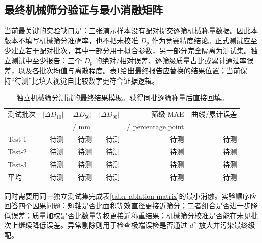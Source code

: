 \subsection{最终机械筛分验证与最小消融矩阵}

当前最关键的实验缺口是：三张演示样本没有配对提交逐筛机械称量数据。因此本版本不填写机械筛分准确率，也不把未校准 $D_p$ 作为竞赛精度结论。正式测试应至少建立若干配对批次，其中一部分用于拟合参数，另一部分完全隔离为测试集。独立测试中至少报告：三个 $D_p$ 的绝对/相对误差、逐筛级质量占比或累计通过率误差，以及各批次均值与离散程度。表\ref{tab:r-physical-template}给出最终报告应替换的结果位置；当前保持“待测”比填入视觉自比较数字更符合证据逻辑。

\begin{table}[t]
\centering
\caption{独立机械筛分测试的最终结果模板。获得同批逐筛称量后直接回填。}
\label{tab:r-physical-template}
\footnotesize
\renewcommand{\arraystretch}{1.12}
\begin{tabular}{lrrrrr}
\toprule
测试批次 & $|\Delta D_{10}|$ & $|\Delta D_{50}|$ & $|\Delta D_{90}|$ & 筛级 MAE & 曲线/累计误差 \\
 & \multicolumn{3}{c}{/ mm} & / percentage point & \\
\midrule
Test-1 & 待测 & 待测 & 待测 & 待测 & 待测 \\
Test-2 & 待测 & 待测 & 待测 & 待测 & 待测 \\
Test-3 & 待测 & 待测 & 待测 & 待测 & 待测 \\
\midrule
平均 & 待测 & 待测 & 待测 & 待测 & 待测 \\
\bottomrule
\end{tabular}
\end{table}

同时需要用同一独立测试集完成表\ref{tab:r-ablation-matrix}的最小消融。实验顺序应回答四个因果问题：短轴是否比面积等效直径更接近筛分；二者组合是否进一步降低误差；质量加权是否比数量等权更接近称重结果；机械筛分校准是否能在未见批次上继续降低误差。异常剔除则用于检查极端误检是否通过 $d^\gamma$ 放大并污染最终级配。

